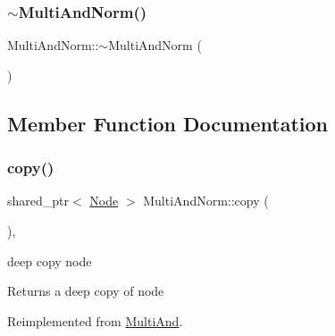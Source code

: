 \mbox{\label{class_multi_and_norm_a3aec280d3f9c2df9ed0eb91e61f8bb4f}} 
\subsubsection{\texorpdfstring{$\sim$\+Multi\+And\+Norm()}{~MultiAndNorm()}}
{\footnotesize\ttfamily Multi\+And\+Norm\+::$\sim$\+Multi\+And\+Norm (\begin{DoxyParamCaption}{ }\end{DoxyParamCaption})\hspace{0.3cm}{\ttfamily [override]}}



\subsection{Member Function Documentation}
\mbox{\label{class_multi_and_norm_a77cbaf6920daa86d9ddc80b2a839a84f}} 
\subsubsection{\texorpdfstring{copy()}{copy()}}
{\footnotesize\ttfamily shared\+\_\+ptr$<$ \hyperlink{class_node}{Node} $>$ Multi\+And\+Norm\+::copy (\begin{DoxyParamCaption}{ }\end{DoxyParamCaption})\hspace{0.3cm}{\ttfamily [override]}, {\ttfamily [virtual]}}



deep copy node 

\begin{DoxyReturn}{Returns}
a deep copy of node 
\end{DoxyReturn}


Reimplemented from \hyperlink{class_multi_and_ad89e8cb08fe1e0793e2e16e837992de2}{Multi\+And}.

\mbox{\label{class_multi_and_norm_a84940789d331007c430096a38f60d124}} 
